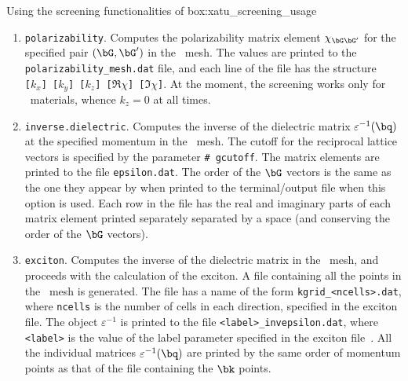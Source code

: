 \begin{mybox}{Using the screening functionalities of \xatu}{box:xatu_screening_usage}
\begin{itemize}
\begin{enumerate}
            Computes the dielectric function at a specified momentum and for a chosen matrix element $(\bG,\bG')$.
            The values of the polarizability as a function of included valence and conduction bands are computed and printed to the \texttt{polarizability\_convergence.dat}.
            Each line of the file has the form \\ \texttt{[\# valence bands] [\# conduction bands] [$\Re{\chi}$] [$\Im{\chi}$]}
            \item \texttt{polarizability}.
            Computes the polarizability matrix element $\chi_{\bG \bG'}$ for the specified pair $(\bG,\bG')$ in the \bz~mesh.
            The values are printed to the \texttt{polarizability\_mesh.dat} file, and each line of the file has the structure \\ \texttt{[$k_x$] [$k_y$] [$k_z$] [$\Re{\chi}$] [$\Im{\chi}$]}.
            At the moment, the screening works only for \bd~materials, whence $k_z = 0$ at all times.
            \item \texttt{inverse.dielectric}.
            Computes the inverse of the dielectric matrix $\varepsilon^{-1}(\bq)$ at the specified momentum in the \bz~mesh.
            The cutoff for the reciprocal lattice vectors is specified by the parameter \texttt{\# gcutoff}.
            The matrix elements are printed to the file \texttt{epsilon.dat}.
            The order of the $\bG$ vectors is the same as the one they appear by when printed to the terminal/output file when this option is used.
            Each row in the file has the real and imaginary parts of each matrix element printed separately separated by a space (and conserving the order of the $\bG$ vectors).
            \item \texttt{exciton}.
            Computes the inverse of the dielectric matrix in the \bz~mesh, and proceeds with the calculation of the exciton.
            A file containing all the points in the \bz~mesh is generated.
            The file has a name of the form \texttt{kgrid\_<ncells>.dat}, where \texttt{ncells} is the number of cells in each direction, specified in the exciton file.
            The object $\varepsilon^{-1}$ is printed to the file \texttt{<label>\_invepsilon.dat}, where \texttt{<label>} is the value of the label parameter specified in the exciton file~\cite{Xatu}.
            All the individual matrices $\varepsilon^{-1}(\bq)$ are printed by the same order of momentum points as that of the file containing the $\bk$ points.
        \end{enumerate}


\end{itemize}
\end{mybox}
